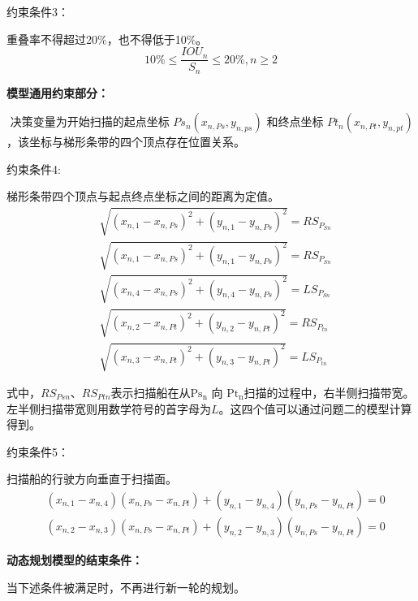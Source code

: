 \documentclass[12pt,a4paper]{article}
\begin{document}
	约束条件3：
	
	重叠率不得超过20\%，也不得低于10\%。
	$$
	10 \% \leq \frac{I O U_n}{S_n} \leq 20 \%, n \geq 2
	$$
	
	\textbf{模型通用约束部分：}
	
	$
	\text { 决策变量为开始扫描的起点坐标 } P s_n\left(x_{n, P s}, y_{n, p s}\right) \text { 和终点坐标 } P t_n\left(x_{n, P t}, y_{n, p t}\right) 
	$，该坐标与梯形条带的四个顶点存在位置关系。
	
	约束条件4:
	
	梯形条带四个顶点与起点终点坐标之间的距离为定值。
	$$
	\begin{aligned}
		& \sqrt{\left(x_{n, 1}-x_{n, P s}\right)^2+\left(y_{n, 1}-y_{n, P s}\right)^2}=R S_{P_{S n}} \\
		& \sqrt{\left(x_{n, 1}-x_{n, P s}\right)^2+\left(y_{n, 1}-y_{n, P s}\right)^2}=R S_{P_{S n}} \\
		& \sqrt{\left(x_{n, 4}-x_{n, P s}\right)^2+\left(y_{n, 4}-y_{n, P s}\right)^2}=L S_{P_{S n}} \\
		& \sqrt{\left(x_{n, 2}-x_{n, P t}\right)^2+\left(y_{n, 2}-y_{n, P t}\right)^2}=R S_{P_{t n}} \\
		& \sqrt{\left(x_{n, 3}-x_{n, P t}\right)^2+\left(y_{n, 3}-y_{n, P t}\right)^2}=L S_{P_{t n}}
	\end{aligned}
	$$
	
	
	式中，$R S_{P s n}$、$R S_{P t n}$表示扫描船在从$\mathrm{Ps}_{\mathrm{n}}$ 向 $\mathrm{Pt}_{\mathrm{n}}$扫描的过程中，右半侧扫描带宽。左半侧扫描带宽则用数学符号的首字母为$L$。这四个值可以通过问题二的模型计算得到。
	
	约束条件5：
	
	扫描船的行驶方向垂直于扫描面。
	$$
	\begin{aligned}
		& \left(x_{n, 1}-x_{n, 4}\right)\left(x_{n, P s}-x_{n, P t}\right)+\left(y_{n, 1}-y_{n, 4}\right)\left(y_{n, P s}-y_{n, P t}\right)=0 \\
		& \left(x_{n, 2}-x_{n, 3}\right)\left(x_{n, P s}-x_{n, P t}\right)+\left(y_{n, 2}-y_{n, 3}\right)\left(y_{n, P s}-y_{n, P t}\right)=0
	\end{aligned}
	$$
	
	\textbf{动态规划模型的结束条件：}
	
	当下述条件被满足时，不再进行新一轮的规划。
	
\end{document}
